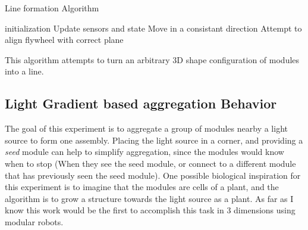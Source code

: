 \begin{algorithm}[ht] 
	\caption{Line formation Algorithm}
	\label{algorithmLine}
	\SetAlgoLined
	initialization\;
	{
		Update sensors and state\;
		{
			Move in a consistant direction \;
		}
		{
			Attempt to align flywheel with correct plane\;
		}
	}
	\caption{This algorithm attempts to turn an arbitrary 3D shape configuration of modules into a line.}
\end{algorithm}


\subsection{Light Gradient based aggregation Behavior}
\label{sec:algLight}
The goal of this experiment is to aggregate a group of modules nearby a light source to form one assembly. Placing the light source in a corner, and providing a \emph{seed} module can help to simplify aggregation, since the modules would know when to stop (When they see the seed module, or connect to a different module that has previously seen the seed module). One possible biological inspiration for this experiment is to imagine that the modules are cells of a plant, and the algorithm is to grow a structure towards the light source as a plant. As far as I know this work would be the first to accomplish this task in 3 dimensions using modular robots.
%
%	
%	
%	

